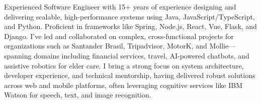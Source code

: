 

\begin{cvparagraph}

Experienced Software Engineer with 15+ years of experience designing and delivering scalable, high-performance systems using Java, JavaScript/TypeScript, and Python. Proficient in frameworks like Spring, Node.js, React, Vue, Flask, and Django. I’ve led and collaborated on complex, cross-functional projects for organizations such as Santander Brasil, Tripadvisor, MotorK, and Mollie—spanning domains including financial services, travel, AI-powered chatbots, and assistive robotics for elder care. I bring a strong focus on system architecture, developer experience, and technical mentorship, having delivered robust solutions across web and mobile platforms, often leveraging cognitive services like IBM Watson for speech, text, and image recognition.
\end{cvparagraph}
